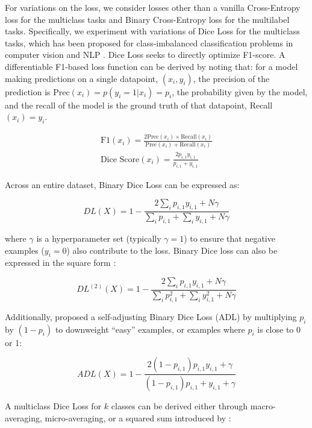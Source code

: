 \documentclass[11pt]{article}
\begin{document}
For variations on the loss, we consider losses other than a vanilla Cross-Entropy loss for the multiclass tasks and Binary Cross-Entropy loss for the multilabel tasks. Specifically, we experiment with variations of Dice Loss for the multiclass tasks, which has been proposed for class-imbalanced classification problems in computer vision \cite{milletari2016v} and NLP \cite{li2019dice}. Dice Loss seeks to directly optimize F1-score. A differentiable F1-based loss function can be derived by noting that: for a model making predictions on a single datapoint, $(x_i, y_i)$, the precision of the prediction is Prec$(x_i) = p(y_i = 1 | x_i) = p_i$, the probability given by the model, and the recall of the model is the ground truth of that datapoint, Recall$(x_i) = y_i$.

\begin{gather*}
    \text{F1}(x_i) = \frac{2\text{Prec}(x_i) \times \text{Recall}(x_i)}{\text{Prec}(x_i) + \text{Recall}(x_i)}\\
    \text{Dice Score}(x_i) = \frac{2p_{i,1} y_{i,1}}{p_{i,1} + y_{i,1}}
\end{gather*}

Across an entire dataset, Binary Dice Loss can be expressed as:

\begin{equation}
DL(X) = 1 - \frac{2 \sum_i p_{i,1} y_{i,1} + N \gamma}{\sum_i p_{i,1} + \sum_i y_{i,1} + N \gamma}
\end{equation}

where $\gamma$ is a hyperparameter set (typically $\gamma = 1$) to ensure that negative examples ($y_i = 0$) also contribute to the loss. Binary Dice loss can also be expressed in the square form \cite{milletari2016v}:

\begin{equation}
    DL^{(2)}(X) = 1 - \frac{2 \sum_i p_{i,1} y_{i,1}  + N \gamma}{\sum_i p_{i,1}^2 + \sum_i y_{i,1}^2 + N \gamma}
\end{equation}

Additionally, \cite{li2019dice} proposed a self-adjusting Binary Dice Loss (ADL) by multiplying $p_i$ by $(1-p_i)$ to downweight ``easy'' examples, or examples where $p_i$ is close to $0$ or 1:

\begin{equation}
    ADL(X) = 1 - \frac{2(1 - p_{i,1})p_{i,1} y_{i,1} + \gamma}{(1 - p_{i,1})p_{i,1} + y_{i,1} + \gamma}
\end{equation}

A multiclass Dice Loss for $k$ classes can be derived either through macro-averaging, micro-averaging, or a squared sum introduced by \cite{sudre2017generalised}:
\end{document}
